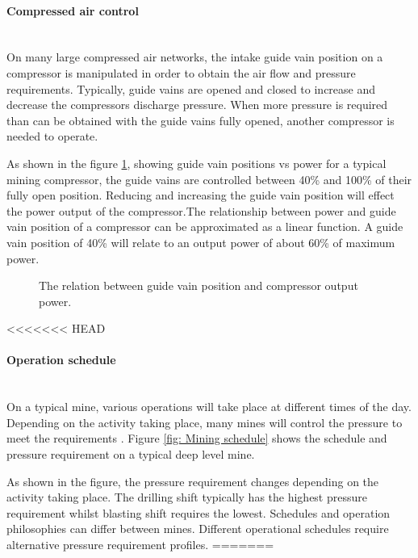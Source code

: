 	\paragraph{Compressed air control}\leavevmode\\
	On many large compressed air networks, the intake guide vain position on a compressor is manipulated in order to obtain the air flow and pressure requirements. Typically, guide vains are opened and closed to increase and decrease the compressors discharge pressure. When more pressure is required than can be obtained with the guide vains fully opened, another compressor is needed to operate.\par
	As shown in the figure \ref{fig: Guide vain position}, showing guide vain positions vs power for a typical mining compressor, the guide vains are controlled between 40\% and 100\% of their fully open position. Reducing and increasing the guide vain position will effect the power output of the compressor.The relationship between power and guide vain position of a compressor can be approximated as a linear function. A guide vain position of 40\% will relate to an output power of about 60\% of maximum power.
	\begin{figure}[h]
		\centering
		\fbox{}
		\caption[The relation between guide vain position and compressor output power.]{The relation between guide vain position and compressor output power.}
		\label{fig: Guide vain position}
	\end{figure}
<<<<<<< HEAD
	\paragraph{Operation schedule}\leavevmode\\
	On a typical mine, various operations will take place at different times of the day. Depending on the activity taking place, many mines will control the pressure to meet the requirements \cite{Kriel2014Masters,Marais2012PhD}. Figure \ref{fig: Mining schedule} shows the schedule and pressure requirement on a typical deep level mine.\par 
	As shown in the figure, the pressure requirement changes depending on the activity taking place. The drilling shift typically has the highest pressure requirement whilst blasting shift requires the lowest. Schedules and operation philosophies can differ between mines. Different operational schedules require alternative pressure requirement profiles.
=======
